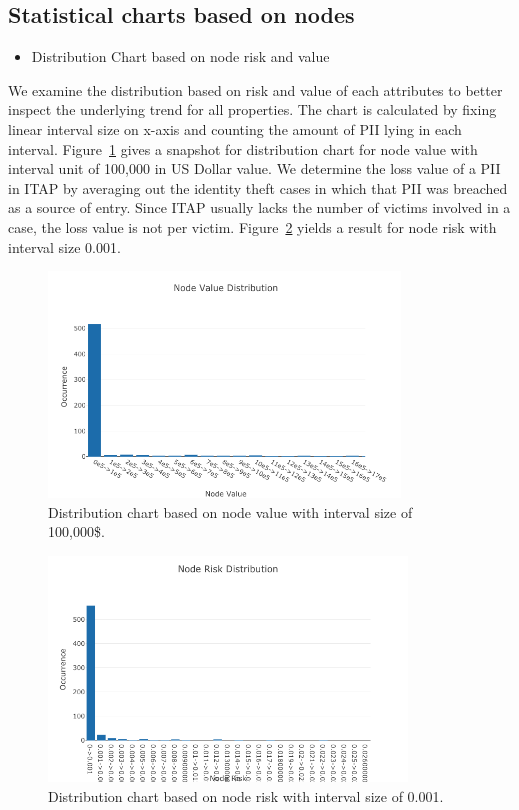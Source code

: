 \documentclass[conference]{IEEEtran}
\begin{document}
\subsection{Statistical charts based on nodes}
\begin{itemize}
\item Distribution Chart based on node risk and value
\end{itemize}

We examine the distribution based on risk and value of each attributes to better inspect the underlying trend for all properties. The chart is calculated by fixing linear interval size on x-axis and counting the amount of PII lying in each interval. Figure~\ref{fig:node_value_distribution} gives a snapshot for distribution chart for node value with interval unit of 100,000 in US Dollar value. We determine the loss value of a PII in ITAP by averaging out the identity theft cases in which that PII was breached as a source of entry. Since ITAP usually lacks the number of victims involved in a case, the loss value is not per victim. Figure~\ref{fig:node_risk_distribution} yields a result for node risk with interval size 0.001.

\begin{figure}[h!]
  \includegraphics[width=\linewidth, height=6cm]{node_value_distribution.png}
  \caption{Distribution chart based on node value with interval size of 100,000\$.}
  \label{fig:node_value_distribution}
\end{figure}

\begin{figure}[h!]
  \includegraphics[width=\linewidth, height=6cm]{node_risk_distribution.png}
  \caption{Distribution chart based on node risk with interval size of 0.001.}
  \label{fig:node_risk_distribution}
\end{figure}
\end{document}
